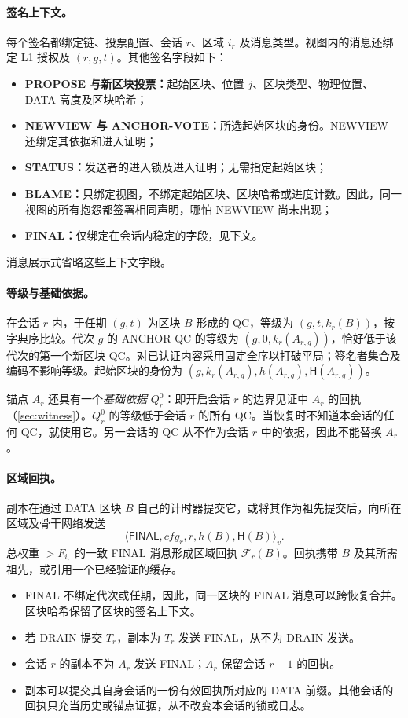 \documentclass[11pt,a4paper]{article}
\newcommand{\FC}{\mathcal F}
\newcommand{\Hash}{\mathsf H}
\newcommand{\tagg}[1]{\ensuremath{\mathsf{#1}}}
\begin{document}
\paragraph{签名上下文。}
每个签名都绑定链、投票配置、会话 $r$、区域 $i_r$ 及消息类型。视图内的消息还绑定 L1 授权及 $(r,g,t)$。其他签名字段如下：
\begin{itemize}
\item \textbf{PROPOSE 与新区块投票：}起始区块、位置 $j$、区块类型、物理位置、DATA 高度及区块哈希；
\item \textbf{NEWVIEW 与 ANCHOR-VOTE：}所选起始区块的身份。NEWVIEW 还绑定其依据和进入证明；
\item \textbf{STATUS：}发送者的进入锁及进入证明；无需指定起始区块；
\item \textbf{BLAME：}只绑定视图，不绑定起始区块、区块哈希或进度计数。因此，同一视图的所有抱怨都签署相同声明，哪怕 NEWVIEW 尚未出现；
\item \textbf{FINAL：}仅绑定在会话内稳定的字段，见下文。
\end{itemize}
消息展示式省略这些上下文字段。

\paragraph{等级与基础依据。}
在会话 $r$ 内，于任期 $(g,t)$ 为区块 $B$ 形成的 QC，等级为 $(g,t,k_r(B))$，按字典序比较。代次 $g$ 的 ANCHOR QC 的等级为 $(g,0,k_r(A_{r,g}))$，恰好低于该代次的第一个新区块 QC。对已认证内容采用固定全序以打破平局；签名者集合及编码不影响等级。起始区块的身份为 $(g,k_r(A_{r,g}),h(A_{r,g}),\Hash(A_{r,g}))$。

锚点 $A_r$ 还具有一个\emph{基础依据} $Q_r^0$：即开启会话 $r$ 的边界见证中 $A_r$ 的回执（\cref{sec:witness}）。$Q_r^0$ 的等级低于会话 $r$ 的所有 QC。当恢复时不知道本会话的任何 QC，就使用它。另一会话的 QC 从不作为会话 $r$ 中的依据，因此不能替换 $A_r$。

\paragraph{区域回执。}
副本在通过 DATA 区块 $B$ 自己的计时器提交它，或将其作为祖先提交后，向所在区域及骨干网络发送
\[
 \langle\tagg{FINAL},\mathit{cfg}_r,r,h(B),\Hash(B)\rangle_v.
\]
总权重 $>F_{i_r}$ 的一致 FINAL 消息形成区域回执 $\FC_r(B)$。回执携带 $B$ 及其所需祖先，或引用一个已经验证的缓存。
\begin{itemize}
\item FINAL 不绑定代次或任期，因此，同一区块的 FINAL 消息可以跨恢复合并。区块哈希保留了区块的签名上下文。
\item 若 DRAIN 提交 $T_r$，副本为 $T_r$ 发送 FINAL，从不为 DRAIN 发送。
\item 会话 $r$ 的副本不为 $A_r$ 发送 FINAL；$A_r$ 保留会话 $r-1$ 的回执。
\item 副本可以提交其自身会话的一份有效回执所对应的 DATA 前缀。其他会话的回执只充当历史或锚点证据，从不改变本会话的锁或日志。
\end{itemize}
\end{document}

